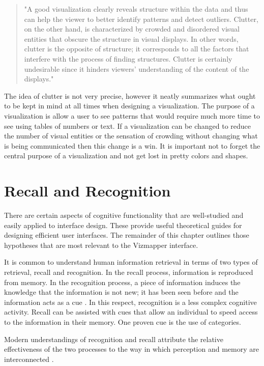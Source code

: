 \begin{quote}
"A good visualization clearly reveals structure within the data and thus can help the viewer to better identify patterns and detect outliers. Clutter, on the other hand, is characterized by crowded and disordered visual entities that obscure the structure in visual displays. In other words, clutter is the opposite of structure; it corresponds to all the factors that interfere with the process of finding structures. Clutter is certainly undesirable since it hinders viewers’ understanding of the content of the displays." \cite{clutter2004}
\end{quote}

The idea of clutter is not very precise, however it neatly summarizes what ought to be kept in mind at all times when designing a visualization. The purpose of a visualization is allow a user to see patterns that would require much more time to see using tables of numbers or text. If a visualization can be changed to reduce the number of visual entities or the sensation of crowding without changing what is being communicated then this change is a win. It is important not to forget the central purpose of a visualization and not get lost in pretty colors and shapes.

\section{Recall and Recognition}

There are certain aspects of cognitive functionality that are well-studied and easily applied to interface design. These provide useful theoretical guides for designing efficient user interfaces. The remainder of this chapter outlines those hypotheses that are most relevant to the Vizmapper interface.

It is common to understand human information retrieval in terms of two types of retrieval, recall and recognition. In the recall process, information is reproduced from memory. In the recognition process, a piece of information induces the knowledge that the information is not new; it has been seen before and the information acts as a cue \cite{hci1998}. In this respect, recognition is a less complex cognitive activity. Recall can be assisted with cues that allow an individual to speed access to the information in their memory. One proven cue is the use of categories.

Modern understandings of recognition and recall attribute the relative effectiveness of the two processes to the way in which perception and memory are interconnected \cite{mindinmind2010}.

